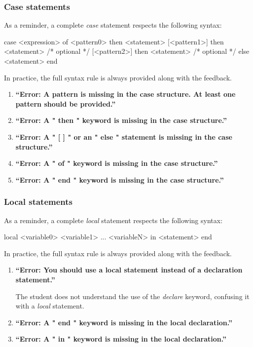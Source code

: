 \documentclass[11pt,a4paper,twoside,openright]{report}
\begin{document}
\subsubsection{Case statements}

As a reminder, a complete \textit{case} statement respects the following syntax:

\begin{OZ}
  case <expression> of <pattern0> then <statement>
  [<pattern1>] then <statement>		/* optional */
  [<pattern2>] then <statement>		/* optional */ 
  else <statement>
  end
\end{OZ}

In practice, the full syntax rule is always provided along with the feedback.

\begin{enumerate}
\item \textbf{\enquote{Error: A pattern is missing in the case structure. At least 
one pattern should be provided.}}

\item \textbf{\enquote{Error: A " then " keyword is missing in the case structure.}}

\item \textbf{\enquote{Error: A " [ ] " or an " else " statement is missing in the 
case structure.}}

\item \textbf{\enquote{Error: A " of " keyword is missing in the case structure.}}

\item \textbf{\enquote{Error: A " end " keyword is missing in the case structure.}}
\end{enumerate}

\subsubsection{Local statements}

As a reminder, a complete \textit{local} statement respects the following 
syntax:

\begin{OZ}
  local <variable0> <variable1> ... <variableN> in
    <statement>
  end
\end{OZ}

In practice, the full syntax rule is always provided along with the feedback.

\begin{enumerate}
\item \textbf{\enquote{Error: You should use a local statement instead of a declaration 
statement.}}

 The student does not understand the use of the \textit{declare} keyword, 
 confusing it with a \textit{local} statement.

\item \textbf{\enquote{Error: A " end " keyword is missing in the local 
declaration.}}

\item \textbf{\enquote{Error: A " in " keyword is missing in the local declaration.}}
\end{enumerate}
\end{document}
